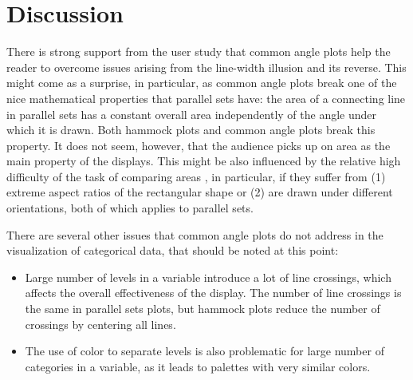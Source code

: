 \section{Discussion}
There is strong support from the user study that common angle plots help the reader to overcome issues arising from the line-width illusion and its reverse. This might come as a surprise, in particular, as common angle plots break one of the nice mathematical properties that parallel sets have:
the area of a connecting line in parallel sets has a constant  overall area  independently of the angle under which it is drawn. Both hammock plots and common angle plots break this property. It does not seem, however, that the audience picks up on area as the main property of the displays. This might be also influenced by the relative high difficulty of the task of comparing areas \cite{heer:2010, kong:2010}, in particular, if they suffer from  (1) extreme aspect ratios of the rectangular shape or (2) are drawn under different orientations, both of which applies to parallel sets. 

There are several other issues that common angle plots do not address in the visualization of categorical data, that should be noted at this point: \begin{itemize}
\item Large number of levels in a variable introduce a lot of line crossings, which affects the overall effectiveness of the display. The number of line crossings is the same in parallel sets plots, but hammock plots reduce the number of crossings by centering all lines.
\item The use of color to separate levels is also problematic for large number of categories in a variable, as it leads to  palettes with very similar colors.
\end{itemize}



